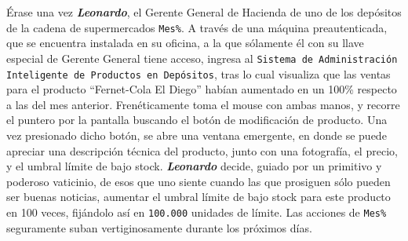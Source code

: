 Érase una vez \textbf{\emph{Leonardo}}, el Gerente General de Hacienda de uno
de los depósitos de la cadena de supermercados \texttt{Mes\%}. A través de una
máquina preautenticada, que se encuentra instalada en su oficina, a la que
sólamente él con su llave especial de Gerente General tiene acceso, ingresa al
\texttt{Sistema de Administración Inteligente de Productos en Depósitos}, tras
lo cual visualiza que las ventas para el producto ``Fernet-Cola El Diego''
habían aumentado en un 100\% respecto a las del mes anterior. Frenéticamente
toma el mouse con ambas manos, y recorre el puntero por la pantalla buscando
el botón de modificación de producto. Una vez presionado dicho botón, se abre
una ventana emergente, en donde se puede apreciar una descripción técnica del
producto, junto con una fotografía, el precio, y el umbral límite de bajo
stock. \textbf{\emph{Leonardo}} decide, guiado por un primitivo y poderoso
vaticinio, de esos que uno siente cuando las que prosiguen sólo pueden ser
buenas noticias, aumentar el umbral límite de bajo stock para este producto en
100 veces, fijándolo así en \texttt{100.000} unidades de límite. Las acciones
de \texttt{Mes\%} seguramente suban vertiginosamente durante los próximos
días.
